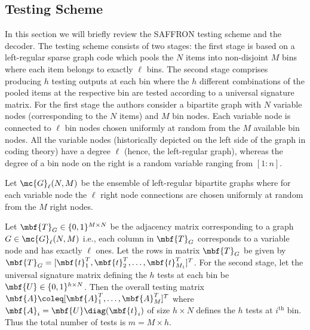 \documentclass[conference,twocolumn]{IEEEtran}
\begin{document}
{\subsection*{Testing Scheme}
In this section we will briefly review the SAFFRON testing scheme \cite{lee2015saffron} and the decoder. The testing scheme consists of two stages: the first stage is based on a left-regular sparse graph code which pools the $N$ items into non-disjoint $M$ bins where each item belongs to exactly $\ell$ bins. The second stage comprises producing $h$ testing outputs at each bin where the $h$ different combinations of the pooled items at the respective bin are tested according to a universal signature matrix. For the first stage the authors consider a bipartite graph with $N$ variable nodes (corresponding to the $N$ items) and $M$ bin nodes. Each variable node is connected to $\ell$ bin nodes chosen uniformly at random from the $M$ available bin nodes. All the variable nodes (historically depicted on the left side of the graph in coding theory) have a degree $\ell$ (hence, the left-regular graph), whereas the degree of a bin node on the right is a random variable ranging from $[1:n]$.

\begin{definition}
Let $\mc{G}_{\ell}(N,M)$ be the ensemble of left-regular bipartite graphs where for each variable node the $\ell$ right node connections are chosen uniformly at random from the $M$ right nodes.
\end{definition}

 Let $\mbf{T}_{G}\in\{0,1\}^{M\times N }$ be the adjacency matrix corresponding to a graph $G\in\mc{G}_{\ell}(N,M)$ i.e., each column in $\mbf{T}_{G}$ corresponds to a variable node and has exactly $\ell$ ones. Let the rows in matrix $\mbf{T}_{G}$ be given by $\mbf{T}_{G}=[\mbf{t}^{T}_1,\mbf{t}^{T}_{2},\dots, \mbf{t}^{T}_{M_1}]^{T}$. For the second stage, let the universal signature matrix defining the $h$ tests at each bin be $\mbf{U}\in\{0,1\}^{h\times N}$. Then the overall testing matrix $\mbf{A}\coleq [\mbf{A}_{1}^{T},\ldots,\mbf{A}_{M}^{T}]^T$ where $\mbf{A}_{i}=\mbf{U} \diag (\mbf{t}_i)$ of size $h\times N$ defines the $h$ tests at $i^{\text{th}}$ bin. Thus the total number of tests is $m=M\times h$.


}
\end{document}
